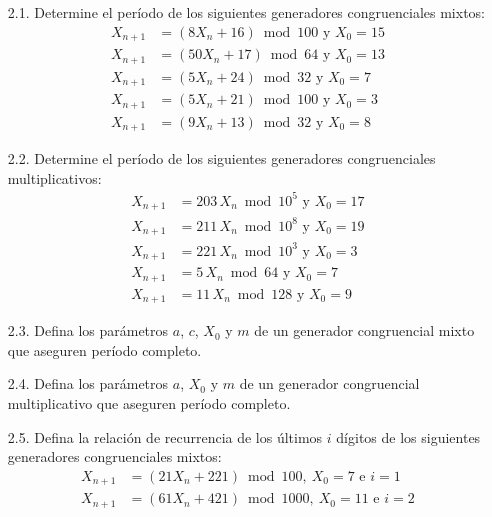 \documentclass[11pt,letterpaper]{report}
\begin{document}
\begin{enumerate}
\item[2.1.] Determine el período de los siguientes generadores
congruenciales mixtos:
\begin{align*}
X_{n+1} &= (8X_n + 16) \bmod 100 \text{ y } X_0 = 15 \\
X_{n+1} &= (50X_n + 17) \bmod 64 \text{ y } X_0 = 13 \\
X_{n+1} &= (5X_n + 24) \bmod 32 \text{ y } X_0 = 7 \\
X_{n+1} &= (5X_n + 21) \bmod 100 \text{ y } X_0 = 3 \\
X_{n+1} &= (9X_n + 13) \bmod 32 \text{ y } X_0 = 8
\end{align*}

\item[2.2.] Determine el período de los siguientes generadores
congruenciales multiplicativos:
\begin{align*}
X_{n+1} &= 203\,X_n \bmod 10^5 \text{ y } X_0 = 17 \\
X_{n+1} &= 211\,X_n \bmod 10^8 \text{ y } X_0 = 19 \\
X_{n+1} &= 221\,X_n \bmod 10^3 \text{ y } X_0 = 3 \\
X_{n+1} &= 5\,X_n \bmod 64 \text{ y } X_0 = 7 \\
X_{n+1} &= 11\,X_n \bmod 128 \text{ y } X_0 = 9
\end{align*}

\item[2.3.] Defina los parámetros $a$, $c$, $X_0$ y $m$ de un generador
congruencial mixto que aseguren período completo.

\item[2.4.] Defina los parámetros $a$, $X_0$ y $m$ de un generador
congruencial multiplicativo que aseguren período completo.

\item[2.5.] Defina la relación de recurrencia de los últimos $i$
dígitos de los siguientes generadores congruenciales mixtos:
\begin{align*}
X_{n+1} &= (21X_n + 221) \bmod 100,\ X_0 = 7 \text{ e } i = 1 \\
X_{n+1} &= (61X_n + 421) \bmod 1000,\ X_0 = 11 \text{ e } i = 2
\end{align*}
\end{enumerate}
\end{document}
